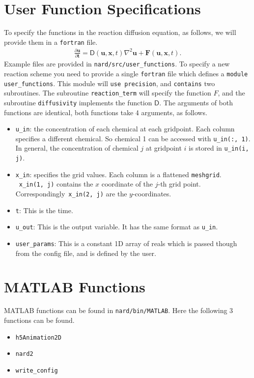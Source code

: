 \documentclass[11pt]{article}
\begin{document}
    \section[User Function Specifications]{User Function Specifications}
    To specify the functions in the reaction diffusion equation, as follows, we will provide them in a \texttt{fortran} file.
    \begin{gather}
        \frac{\partial \mathbf{u} }{\partial \mathbf{t}} = \mathsf{D}(\mathbf{u}, \mathbf{x}, t)\nabla^2 \mathbf{u} + \mathbf{F}(\mathbf{u}, \mathbf{x}, t).
    \end{gather}
    Example files are provided in \texttt{nard/src/user\_functions}.
    To specify a new reaction scheme you need to provide a single \texttt{fortran} file which defines a \texttt{module user\_functions}.
    This module will \texttt{use precision}, and \texttt{contains} two subroutines.
    The subroutine \texttt{reaction\_term} will specify the function \(F\), and the subroutine \texttt{diffusivity} implements the function \(\mathsf{D}\).
    The arguments of both functions are identical, both functions take 4 arguments, as follows.
    \begin{itemize}
        \item \texttt{u\_in}: the concentration of each chemical at each gridpoint.
        Each column specifies a different chemical.
        So chemical 1 can be accessed with \texttt{u\_in(:, 1)}.
        In general, the concentration of chemical \(j\) at gridpoint \(i\) is stored in \texttt{u\_in(i, j)}.
        \item \texttt{x\_in}: specifies the grid values. Each column is a flattened \texttt{meshgrid}.
        ~\texttt{x\_in(1, j)} contains the \(x\) coordinate of the \(j\)-th grid point.
        Correspondingly~\texttt{x\_in(2, j)} are the \(y\)-coordinates.
        \item \texttt{t}: This is the time.
        \item \texttt{u\_out}: This is the output variable. It has the same format as \texttt{u\_in}.
        \item \texttt{user\_params}: This is a constant 1D array of reals which is passed though from the config file, and is defined by the user.
    \end{itemize}


    \section[MATLAB Functions]{MATLAB Functions}
    MATLAB functions can be found in \texttt{nard/bin/MATLAB}.
    Here the following 3 functions can be found.
    \begin{itemize}
        \item \texttt{h5Animation2D}
        \item \texttt{nard2}
        \item \texttt{write\_config}
    \end{itemize}
    
\end{document}

